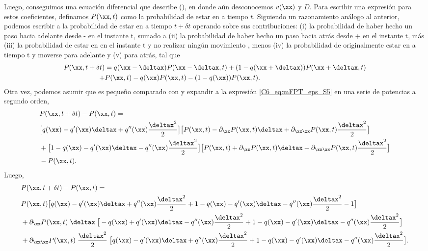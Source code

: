 {Luego, conseguimos una ecuación diferencial que describe \epsplus(\xx), en donde aún desconocemos $v(\xx)$ y $D$. Para escribir una expresión para estos coeficientes, definamos $P(\xx,t)$ como la probabilidad de estar en \xx a tiempo $t$. Siguiendo un razonamiento análogo al anterior, podemos escribir a la probabilidad de estar en \xx a tiempo $t+\delta t$ operando sobre sus contribuciones: (i) la probabilidad de haber hecho un paso hacia adelante desde \xx - \deltax en el instante t, sumado a (ii) la probabilidad de haber hecho un paso hacia atrás desde \xx + \deltax en el instante t, más (iii) la probabilidad de estar en \xx en el instante t y no realizar ningún movimiento , menos (iv) la probabilidad de originalmente estar en \xx a tiempo t y moverse para adelante y (v) para atrás, tal que 
\begin{align}
    P(\xx,t + \delta t ) &=  q(\xx - \deltax) P(\xx-\deltax,t) + (1-q(\xx + \deltax)) P(\xx+\deltax,t) \nonumber \\ +& P(\xx,t) - q(\xx) P(\xx,t) - (1-q(\xx)) P(\xx,t).
    \label{C6_eq:mFPT_eps_S5}
\end{align}
Otra vez, podemos asumir que \deltax es pequeño comparado con \xx y expandir a la expresión \ref{C6_eq:mFPT_eps_S5} en una serie de potencias a segundo orden, 
\begin{align}
    & P( \xx,t + \delta t) - P(\xx,t) = \nonumber \\
    & \big[ q(\xx) - q'(\xx)\deltax + q''(\xx) \frac{\deltax^2}{2}  \big] \big[ P(\xx,t) - \partial_\xx P(\xx,t) \deltax + \partial_{\xx \xx} P(\xx,t) \frac{\deltax^2}{2}  \big] \nonumber \\ & + \big[ 1 - q(\xx) - q'(\xx)\deltax - q''(\xx) \frac{\deltax^2}{2}  \big] \big[ P(\xx,t) + \partial_\xx P(\xx,t) \deltax + \partial_{\xx \xx} P(\xx,t) \frac{\deltax^2}{2}  \big] \nonumber \\ & - P(\xx,t) .
\end{align}
Luego, 
\begin{align}
    & P( \xx,t + \delta t) - P(\xx,t) = \nonumber \\
    & P(\xx,t) \big[ q(\xx) - q'(\xx)\deltax + q''(\xx) \frac{\deltax^2}{2} + 1 - q(\xx) - q'(\xx)\deltax - q''(\xx) \frac{\deltax^2}{2} -1\big] \nonumber \\ & + \partial_\xx P(\xx,t) \; \deltax \; \big[ - q(\xx) + q'(\xx)\deltax - q''(\xx) \frac{\deltax^2}{2} + 1 - q(\xx) - q'(\xx)\deltax - q''(\xx) \frac{\deltax^2}{2}\big] \nonumber \\ &+ \partial_{\xx \xx} P(\xx,t) \;  \frac{\deltax^2}{2} \; \big[  q(\xx) - q'(\xx)\deltax + q''(\xx) \frac{\deltax^2}{2} +  1 - q(\xx) - q'(\xx)\deltax - q''(\xx) \frac{\deltax^2}{2} \big] .

\end{align}}
